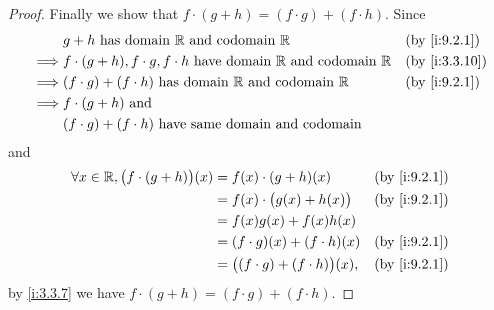 \begin{proof}
  Finally we show that \(f \cdot (g + h) = (f \cdot g) + (f \cdot h)\).
  Since
  \begin{align*}
             & g + h \text{ has domain } \R \text{ and codomain } \R                                   &  & \by{i:9.2.1}  \\
    \implies & f \cdot (g + h), f \cdot g, f \cdot h  \text{ have domain } \R \text{ and codomain } \R &  & \by{i:3.3.10} \\
    \implies & (f \cdot g) + (f \cdot h)  \text{ has domain } \R \text{ and codomain } \R              &  & \by{i:9.2.1}  \\
    \implies & f \cdot (g + h) \text{ and }                                                                               \\
             & (f \cdot g) + (f \cdot h) \text{ have same domain and codomain}
  \end{align*}
  and
  \begin{align*}
    \forall x \in \R, \big(f \cdot (g + h)\big)(x) & = f(x) \cdot (g + h)(x)                   &  & \by{i:9.2.1} \\
                                                   & = f(x) \cdot \big(g(x) + h(x)\big)        &  & \by{i:9.2.1} \\
                                                   & = f(x)g(x) + f(x)h(x)                                       \\
                                                   & = (f \cdot g)(x) + (f \cdot h)(x)         &  & \by{i:9.2.1} \\
                                                   & = \big((f \cdot g) + (f \cdot h)\big)(x), &  & \by{i:9.2.1}
  \end{align*}
  by \cref{i:3.3.7} we have \(f \cdot (g + h) = (f \cdot g) + (f \cdot h)\).
\end{proof}
